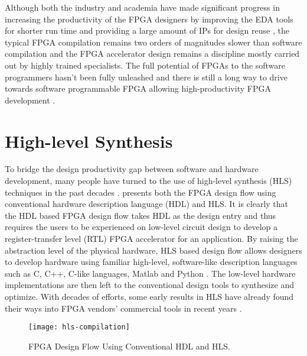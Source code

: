 Although both the industry and academia have made significant progress in increasing the productivity of the FPGA designers by improving the EDA tools for shorter run time \cite{VivadoHLS, mulpuri2001runtime, moctar2014parallel, goeders2011deterministic} and providing a large amount of IPs for design reuse \cite{xilinx-pc, altera-pc}, the typical FPGA compilation remains two orders of magnitudes slower than software compilation and the FPGA accelerator design remains a discipline mostly carried out by highly trained specialists. The full potential of FPGAs to the software programmers hasn't been fully unleashed and there is still a long way to drive towards software programmable FPGA allowing high-productivity FPGA development \cite{fsp2014, fsp2015}.

\section{High-level Synthesis}
To bridge the design productivity gap between software and hardware development, many people have turned to the use of high-level synthesis (HLS) techniques in the past decades \cite{cong2011high}.  presents both the FPGA design flow using conventional hardware description language (HDL) and HLS. It is clearly that the HDL based FPGA design flow takes HDL as the design entry and thus requires the users to be experienced on low-level circuit design to develop a register-transfer level (RTL) FPGA accelerator for an application. By raising the abstraction level of the physical hardware, HLS based design flow allows designers to develop hardware using familiar high-level, software-like description languages such as C, C++, C-like languages, Matlab and Python \cite{handel-c, ROCCC, VivadoHLS, OpenCL, matlab, myhdl}. The low-level hardware implementations are then left to the conventional design tools to synthesize and optimize. With decades of efforts, some early results in HLS have already found their ways into FPGA vendors' commercial tools in recent years \cite{OpenCL, VivadoHLS, handel-c, zhang2008autopilot, chen2005xpilot}. 

\begin{figure}
\centering
\texttt{[image: hls-compilation]}
\caption{FPGA Design Flow Using Conventional HDL and HLS.}
\label{fig:hls-compilation}
\end{figure}

